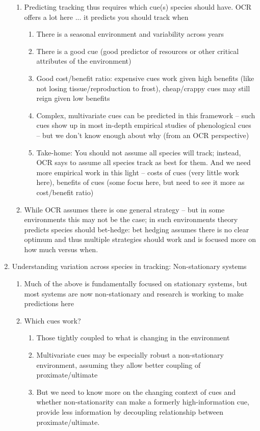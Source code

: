 \documentclass[11pt,letterpaper]{article}
\begin{document}
\begin{enumerate}
\begin{enumerate}
\item Predicting tracking thus requires which cue(s) species should have. OCR offers a lot here ... it predicts you should track when
\begin{enumerate}
\item There is a seasonal environment and variability across years
\item There is a good cue (good predictor of resources or other critical attributes of the environment)
\item Good cost/benefit ratio: expensive cues work given high benefits (like not losing tissue/reproduction to frost), cheap/crappy cues may still reign given low benefits
\item Complex, multivariate cues can be predicted in this framework -- such cues show up in most in-depth empirical studies of phenological cues -- but we don't know enough about why (from an OCR perspective)
\item Take-home: You should not assume all species will track; instead, OCR says to assume all species track as best for them. And we need more empirical work in this light -- costs of cues (very little work here), benefits of cues (some focus here, but need to see it more as cost/benefit ratio)
\end{enumerate}
\item While OCR assumes there is one general strategy -- but in some environments this may not be the case; in such environments theory predicts species should bet-hedge: bet hedging assumes there is no clear optimum and thus multiple strategies should work and is focused more on how much versus when.
\end{enumerate}
\item Understanding variation across species in tracking: Non-stationary systems
\begin{enumerate}
\item Much of the above is fundamentally focused on stationary systems, but most systems are now non-stationary and research is working to make predictions here
\item Which cues work?
\begin{enumerate}
\item Those tightly coupled to what is changing in the environment
\item Multivariate cues may be especially robust  a non-stationary environment, assuming they allow better coupling of proximate/ultimate
\item But we need to know more on the changing context of cues and whether non-stationarity can make a formerly high-information cue, provide less information by decoupling relationship between proximate/ultimate.

\end{enumerate}
\end{enumerate}
\end{enumerate}
\end{document}
